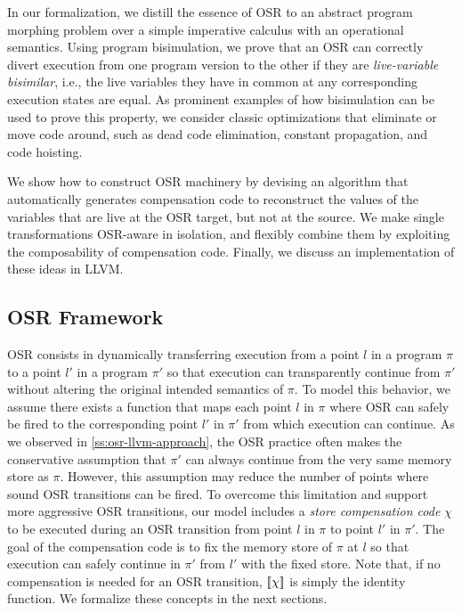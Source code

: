 In our formalization, we distill the essence of OSR to an abstract program morphing problem over a simple imperative calculus with an operational semantics. %
Using program bisimulation, we prove that an OSR can correctly divert execution from one program version to the other if they are {\em live-variable bisimilar}, i.e., the live variables they have in common at any corresponding execution states are equal. As prominent examples of how bisimulation can be used to prove this property, we consider classic optimizations that eliminate or move code around, such as dead code elimination, constant propagation, and code hoisting.

We show how to construct OSR machinery by devising an algorithm that automatically generates compensation code to reconstruct the values of the variables that are live at the OSR target, but not at the source. We make single transformations OSR-aware in isolation, and flexibly combine them by exploiting the composability of compensation code. Finally, we discuss an implementation of these ideas in LLVM.




\subsection{OSR Framework}
OSR consists in dynamically transferring execution from a point $l$ in a program $\pi$ to a point $l'$ in a program $\pi'$ so that execution can transparently continue from $\pi'$ without altering the original intended semantics of $\pi$. To model this behavior, we assume there exists a function that maps each point $l$ in $\pi$ where OSR can safely be fired to the corresponding point $l'$ in $\pi'$ from which execution can continue.
As we observed in \mysection\ref{ss:osr-llvm-approach}, the OSR practice often makes the conservative assumption that $\pi'$ can always continue from the very same memory store as $\pi$. However, this assumption may reduce the number of points where sound OSR transitions can be fired. To overcome this limitation and support more aggressive OSR transitions, our model includes a {\em store compensation code} $\chi$ to be executed during an OSR transition from point $l$ in $\pi$ to point $l'$ in $\pi'$. The goal of the compensation code is to fix the memory store of $\pi$ at $l$ so that execution can safely continue in $\pi'$ from $l'$ with the fixed store. Note that, if no compensation is needed for an OSR transition, $[\![\chi]\!]$ is simply the identity function. We formalize these concepts in the next sections.

